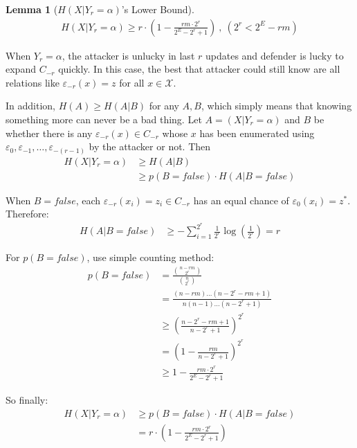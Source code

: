 \documentclass[10pt, conference, compsocconf]{IEEEtran}
\newtheorem{mylemma}{Lemma}
\begin{document}
        \begin{mylemma}[$H(X | Y_r = \alpha)$'s Lower Bound]\label{lem1}
        \begin{align*}
            H(X|Y_r = \alpha) \geq r \cdot (1-\frac{r m \cdot 2^r}{2^E-2^r+1}) ~,~(2^r < 2^E - r m)
        \end{align*}
        \end{mylemma}

        \begin{IEEEproof}
            When $Y_r = \alpha$, the attacker
            is unlucky in last $r$ updates
            and defender is lucky
            to expand $C_{-r}$ quickly.
            In this case, the best that attacker
            could still know are all relations
            like $\varepsilon_{-r}(x) = z$ for all $x \in \mathcal X$.

            In addition, $H(A) \geq H(A|B)$ for
            any $A, B$, which simply means that knowing something
            more can never be a bad thing. Let $A = (X | Y_r = \alpha)$
            and $B$ be whether there is any $\varepsilon_{-r}(x) \in C_{-r}$ whose $x$
            has been enumerated using $\varepsilon_0, \varepsilon_{-1}, \ldots, \varepsilon_{-(r-1)}$
            by the attacker or not.
            Then
            \begin{align*}
                H(X | Y_r = \alpha) %
                    &\geq H(A | B)\\
                    &\geq p(B = false) \cdot H(A | B = false)
            \end{align*}

            When $B = false$, each $\varepsilon_{-r}(x_i) = z_i \in C_{-r}$
            has an equal chance of $\varepsilon_0(x_i) = z^*$. Therefore:
            \begin{align*}
                H(A | B = false) &\geq -\sum_{i = 1}^{2^r} \frac{1}{2^r} \log(\frac{1}{2^r})
                    = r
            \end{align*}

            For $p(B = false)$, use simple counting method:
            \begin{align*}
                p(B = false) &= \frac{\binom{n-r m}{2^r}}{\binom{n}{2^r}}\\
                    &= \frac{(n-r m)\ldots(n-2^r-r m+1)}{n(n-1)\ldots(n-2^r+1)}\\
                    &\geq (\frac{n-2^r-r m+1}{n-2^r+1})^{2^r}\\
                    &= (1-\frac{r m}{n-2^r+1})^{2^r}\\
                    &\geq 1-\frac{r m \cdot 2^r}{2^E-2^r+1}
            \end{align*}

            So finally:
            \begin{align*}
                H(X | Y_r = \alpha) &\geq p(B = false) \cdot H(A | B = false)\\
                    &= r \cdot (1-\frac{r m \cdot 2^r}{2^E-2^r+1})
            \end{align*}
        \end{IEEEproof}
        
\end{document}
